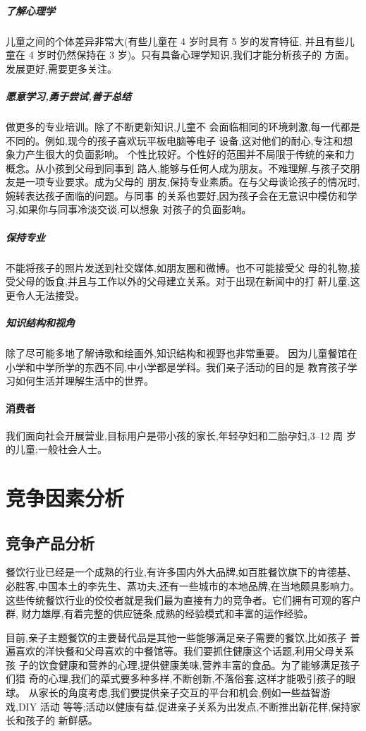 \subparagraph{ 了解心理学 }
儿童之间的个体差异非常大(有些儿童在 4 岁时具有 5 岁的发育特征,
并且有些儿童在 4 岁时仍然保持在 3 岁)。只有具备心理学知识,我们才能分析孩子的
方面。发展更好,需要更多关注。

\subparagraph{ 愿意学习,勇于尝试,善于总结 }
做更多的专业培训。除了不断更新知识,儿童不
会面临相同的环境刺激,每一代都是不同的。例如,现今的孩子喜欢玩平板电脑等电子
设备,这对他们的耐心,专注和想象力产生很大的负面影响。
个性比较好。个性好的范围并不局限于传统的亲和力概念。从小孩到父母到同事到
路人,能够与任何人成为朋友。不难理解,与孩子交朋友是一项专业要求。成为父母的
朋友,保持专业素质。在与父母谈论孩子的情况时,婉转表达孩子面临的问题。与同事
的关系也要好,因为孩子会在无意识中模仿和学习,如果你与同事冷淡交谈,可以想象
对孩子的负面影响。

\subparagraph{ 保持专业 }
不能将孩子的照片发送到社交媒体,如朋友圈和微博。也不可能接受父
母的礼物,接受父母的饭食,并且与工作以外的父母建立关系。对于出现在新闻中的打
鼾儿童,这更令人无法接受。

\subparagraph{ 知识结构和视角 }
除了尽可能多地了解诗歌和绘画外,知识结构和视野也非常重要。
因为儿童餐馆在小学和中学所学的东西不同,中小学都是学科。我们亲子活动的目的是
教育孩子学习如何生活并理解生活中的世界。

\paragraph{消费者}
我们面向社会开展营业,目标用户是带小孩的家长,年轻孕妇和二胎孕妇,3--12 周
岁的儿童;一般社会人士。

\section{竞争因素分析}
\subsection{竞争产品分析}
餐饮行业已经是一个成熟的行业,有许多国内外大品牌,如百胜餐饮旗下的肯德基、
必胜客,中国本土的李先生、蒸功夫,还有一些城市的本地品牌,在当地颇具影响力。
这些传统餐饮行业的佼佼者就是我们最为直接有力的竞争者。它们拥有可观的客户群,
财力雄厚,有着完整的供应链条,成熟的经验模式和丰富的运作经验。

目前,亲子主题餐饮的主要替代品是其他一些能够满足亲子需要的餐饮,比如孩子
普遍喜欢的洋快餐和父母喜欢的中餐馆等。我们要抓住健康这个话题,利用父母关系孩
子的饮食健康和营养的心理,提供健康美味,营养丰富的食品。为了能够满足孩子们猎
奇的心理,我们的菜式要多种多样,不断创新,不落俗套,这样才能吸引孩子的眼球。
从家长的角度考虑,我们要提供亲子交互的平台和机会,例如一些益智游戏,DIY 活动
等等;活动以健康有益,促进亲子关系为出发点,不断推出新花样,保持家长和孩子的
新鲜感。

